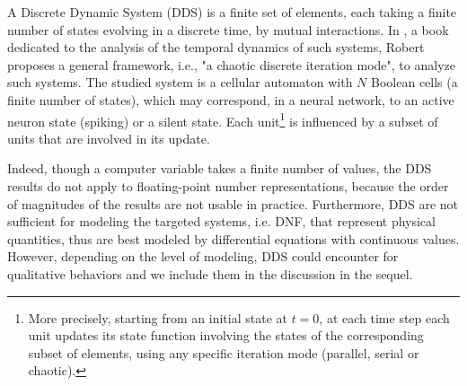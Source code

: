 A Discrete Dynamic System (DDS) is a finite set of elements, each taking a finite number of states evolving in a discrete time, by mutual interactions. In \cite {Robert:1994}, a book dedicated to the analysis of the temporal dynamics of such systems, Robert proposes a general framework, i.e., "a chaotic discrete iteration mode", to analyze such systems. The studied system is a cellular automaton with $N$ Boolean cells (a finite number of states), which may correspond, in a neural network, to an active neuron state (spiking) or a silent state. Each unit\footnote{More precisely, starting from an initial state at $t=0$, at each time step each unit updates its state function involving the states of the corresponding subset of elements, using any specific iteration mode (parallel, serial or chaotic).} is influenced by a subset of units that are involved in its update. 

Indeed, though a computer variable takes a finite number of values, the DDS results do not apply to floating-point number representations, because the order of magnitudes of the results are not usable in practice. Furthermore, DDS are not sufficient for modeling the targeted systems, i.e. DNF, that represent physical quantities, thus are best modeled by differential equations with continuous values. However, depending on the level of modeling, DDS could encounter for qualitative behaviors and we include them in the discussion in the sequel.

